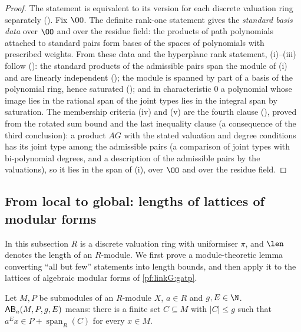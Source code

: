 \begin{proof}
The statement is equivalent to its version for each discrete valuation ring separately
(). Fix $\OO$. The definite
rank-one statement gives the \emph{standard basis data} over $\OO$ and over the residue field: the products of path
polynomials attached to standard pairs form bases of the spaces of polynomials with prescribed weights. From these data and
the hyperplane rank statement, (i)--(iii) follow
(): the standard products of
the admissible pairs span the module of (i) and are linearly independent
(); the module is spanned by
part of a basis of the polynomial ring, hence saturated
(); and in characteristic $0$ a
polynomial whose image lies in the rational span of the joint types lies in the integral span by saturation. The membership
criteria (iv) and (v) are the fourth clause
(), proved from the rotated sum bound
and the last inequality clause (a consequence of the third conclusion): a product $AG$ with the stated valuation and degree
conditions has its joint type among the admissible pairs (a comparison of joint types with bi-polynomial degrees, and a
description of the admissible pairs by the valuations), so it lies in the span of (i), over $\OO$ and over the residue
field.
\end{proof}

\subsection{From local to global: lengths of lattices of modular forms}\label{sec:pf:linkG:lengths}

In this subsection $R$ is a discrete valuation ring with uniformiser $\pi$, and $\len$ denotes the length of an
$R$-module. We first prove a module-theoretic lemma converting ``all but few'' statements into length bounds, and then
apply it to the lattices of algebraic modular forms of \cref{pf:linkG:gatp}.

\begin{definition}\label{pf:linkG:allbut}
Let $M,P$ be submodules of an $R$-module $X$, $a\in R$ and $g,E\in\N$. $\mathsf{AB}_a(M,P,g,E)$ means: there is a finite set
$C\subseteq M$ with $|C|\le g$ such that $a^Ex\in P+\operatorname{span}_R(C)$ for every $x\in M$.
\end{definition}

